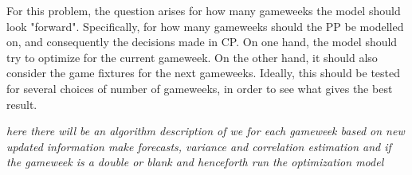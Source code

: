\newpar

For this problem, the question arises for how many gameweeks the model should look "forward". Specifically, for how many gameweeks should the PP be modelled on, and consequently the decisions made in CP. On one hand, the model should try to optimize for the current gameweek. On the other hand, it should also consider the game fixtures for the next gameweeks. Ideally, this should be tested for several choices of number of gameweeks, in order to see what gives the best result. 


\newpar



\textit{here there will be an algorithm description of we for each gameweek based on new updated information make forecasts, variance and correlation estimation and if the gameweek is a double or blank and henceforth run the optimization model}

